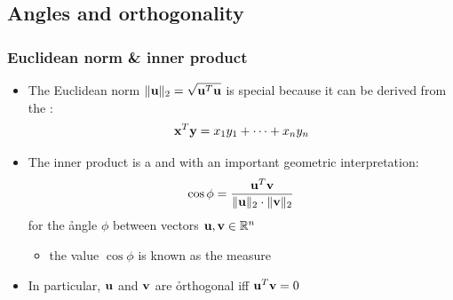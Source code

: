 \documentclass[t]{beamer} %
\begin{document}


\subsection{Angles and orthogonality}

\begin{frame}
  \frametitle{Euclidean norm \& inner product}

  \begin{itemize}
  \item The Euclidean norm $\norm[2]{\vu} = \sqrt{\vu^T \vu}$ is
    special because it can be derived from the :
    \[
    \vx^T \vy = x_1 y_1 + \dots + x_n y_n
    \]
  \item<2-> The inner product is a  and 
     with an important geometric interpretation:
    \[
    \cos \phi = \frac{\vu^T \vv}{ \norm[2]{\vu}\cdot \norm[2]{\vv} }
    \]
    for the \h{angle} $\phi$ between vectors $\vu, \vv\in \setR^n$
    \begin{itemize}
    \item the value $\cos \phi$ is known as the  measure
    \end{itemize}
  \item<3-> In particular, $\vu$ and $\vv$ are \h{orthogonal} iff $\vu^T \vv = 0$
  \end{itemize}
\end{frame}
\end{document}
